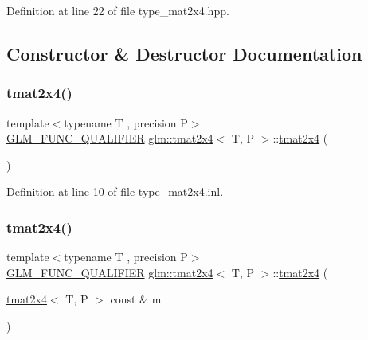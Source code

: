 Definition at line 22 of file type\+\_\+mat2x4.\+hpp.



\subsection{Constructor \& Destructor Documentation}
\mbox{\label{structglm_1_1tmat2x4_a7ff66efb5ac0214a8621e3251176b7d9}} 
\subsubsection{\texorpdfstring{tmat2x4()}{tmat2x4()}\hspace{0.1cm}{\footnotesize\ttfamily [1/22]}}
{\footnotesize\ttfamily template$<$typename T , precision P$>$ \\
\mbox{\hyperlink{setup_8hpp_a33fdea6f91c5f834105f7415e2a64407}{G\+L\+M\+\_\+\+F\+U\+N\+C\+\_\+\+Q\+U\+A\+L\+I\+F\+I\+ER}} \mbox{\hyperlink{structglm_1_1tmat2x4}{glm\+::tmat2x4}}$<$ T, P $>$\+::\mbox{\hyperlink{structglm_1_1tmat2x4}{tmat2x4}} (\begin{DoxyParamCaption}{ }\end{DoxyParamCaption})}



Definition at line 10 of file type\+\_\+mat2x4.\+inl.

\mbox{\label{structglm_1_1tmat2x4_a4f619511e1e69d88ca2bfb4e69702a91}} 
\subsubsection{\texorpdfstring{tmat2x4()}{tmat2x4()}\hspace{0.1cm}{\footnotesize\ttfamily [2/22]}}
{\footnotesize\ttfamily template$<$typename T , precision P$>$ \\
\mbox{\hyperlink{setup_8hpp_a33fdea6f91c5f834105f7415e2a64407}{G\+L\+M\+\_\+\+F\+U\+N\+C\+\_\+\+Q\+U\+A\+L\+I\+F\+I\+ER}} \mbox{\hyperlink{structglm_1_1tmat2x4}{glm\+::tmat2x4}}$<$ T, P $>$\+::\mbox{\hyperlink{structglm_1_1tmat2x4}{tmat2x4}} (\begin{DoxyParamCaption}\item[{\mbox{\hyperlink{structglm_1_1tmat2x4}{tmat2x4}}$<$ T, P $>$ const \&}]{m }\end{DoxyParamCaption})}



